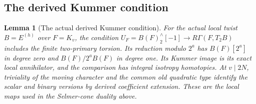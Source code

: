 \documentclass[11pt]{article}
\newtheorem{lemma}[theorem]{Lemma}
\theoremstyle{definition}
\theoremstyle{remark}
\begin{document}
\subsection{The derived Kummer condition}
\begin{lemma}[The actual derived Kummer condition]\label{ex:arith-local-kummer}
For the actual local twist $B=E^{(h)}$ over $F=K_v$, the condition
$U_F=B(F)^\wedge_2[-1]\to R\Gamma(F,T_2B)$ includes the finite
two-primary torsion. Its reduction modulo $2^a$ has
$B(F)[2^a]$ in degree zero and $B(F)/2^aB(F)$ in degree one.
Its Kummer image is its exact local annihilator, and the comparison
has integral isotropy homotopies. At $v\mid2N$, triviality of the
moving character and the common old quadratic type identify the
scalar and binary versions by derived coefficient extension.
These are the local maps used in the Selmer-cone duality above.
\end{lemma}
\end{document}

